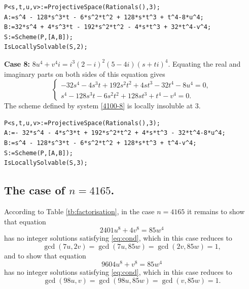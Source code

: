 \documentclass[a4paper,12pt,english,reqno]{amsart}
\begin{document}
\begin{lstlisting}
P<s,t,u,v>:=ProjectiveSpace(Rationals(),3);
A:=s^4 - 128*s^3*t - 6*s^2*t^2 + 128*s*t^3 + t^4-8*u^4;
B:=32*s^4 + 4*s^3*t - 192*s^2*t^2 - 4*s*t^3 + 32*t^4-v^4;
S:=Scheme(P,[A,B]);
IsLocallySolvable(S,2);
\end{lstlisting}

{\bf Case 8:} $8u^4+v^4i=i^3(2-i)^2(5-4i)(s+ti)^4$. Equating the real and imaginary parts on both sides of this equation gives
\begin{equation}\label{4100-8}
\begin{cases}
- 32s^4 - 4s^3t + 192s^2t^2 + 4st^3 - 32t^4-8u^4 =0,\\
s^4 - 128s^3t - 6s^2t^2 + 128st^3 + t^4-v^4=0.
\end{cases}
\end{equation}
The scheme defined by system \eqref{4100-8} is locally insoluble at $3$.





\begin{lstlisting}
P<s,t,u,v>:=ProjectiveSpace(Rationals(),3);
A:=- 32*s^4 - 4*s^3*t + 192*s^2*t^2 + 4*s*t^3 - 32*t^4-8*u^4;
B:=s^4 - 128*s^3*t - 6*s^2*t^2 + 128*s*t^3 + t^4-v^4;
S:=Scheme(P,[A,B]);
IsLocallySolvable(S,3);
\end{lstlisting}


\subsection{The case of $n=4165$.} %
According to Table \ref{tb:factorisation}, in the case $n=4165$ it remains to
show that equation 
\begin{equation}\label{4165.1}
2401 u^8 + 4 v^8=85  w^4
\end{equation}
has no integer solutions satisfying \eqref{eq:cond}, which in this case reduces to  \begin{equation}\label{E22}\gcd(7u,2v)=\gcd(7u,85w)=\gcd(2v,85w)=1,\end{equation} 
and to show that equation 
\begin{equation}\label{4165.2}
9604 u^8 + v^8=85  w^4
\end{equation}
has no integer solutions satisfying \eqref{eq:cond}, which in this case reduces to \[\gcd(98u,v)=\gcd(98u,85w)=\gcd(v,85w)=1.\]
\end{document}
